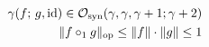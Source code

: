 \documentclass[preview]{standalone}
\begin{document}
\begin{align*}
\special{dvisvgm:raw <g id='unique000'>}\gamma(f;\, g, \operatorname{id}) \in \mathcal{O}_{\text{syn}}(\gamma,\gamma,\gamma+1;\gamma+2)\\\|f \circ_1 g\|_{\text{op}} \le \|f\|\cdot\|g\| \le 1\special{dvisvgm:raw </g>}
\end{align*}
\end{document}
